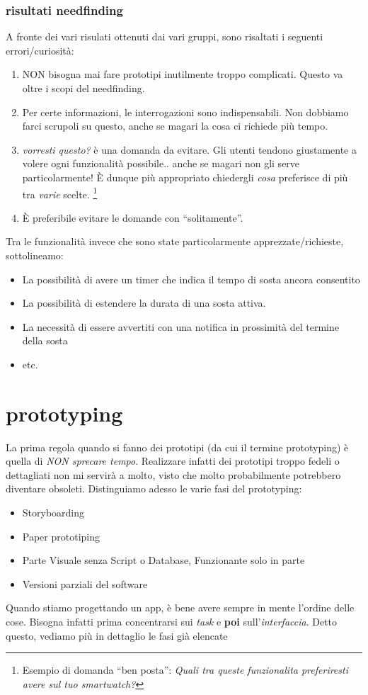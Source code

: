 \documentclass[oneside]{book}
\begin{document}
			\subsubsection{risultati needfinding}
			A fronte dei vari risulati ottenuti dai vari gruppi, sono risaltati i seguenti errori/curiosità:\\
			\begin{enumerate}
			\item NON bisogna mai fare prototipi inutilmente troppo complicati. Questo va oltre i scopi del needfinding. 
			\item Per certe informazioni, le interrogazioni sono indispensabili. Non dobbiamo farci scrupoli su questo, anche se magari la cosa ci richiede più tempo.
			\item \emph{vorresti questo?} è una domanda da evitare. Gli utenti tendono giustamente a volere ogni funzionalità possibile.. anche se magari non gli serve particolarmente! È dunque più appropriato chiedergli \emph{cosa} preferisce di più tra \emph{varie} scelte. \footnote{ Esempio di domanda ``ben posta'': \emph{Quali tra queste funzionalita preferiresti avere sul tuo smartwatch?}}
			\item È preferibile evitare le domande con ``solitamente''.
			\end{enumerate}
			Tra le funzionalità invece che sono state particolarmente apprezzate/richieste, sottolineamo:
			\begin{itemize}
			\item La possibilità di avere un timer che indica il tempo di sosta ancora consentito
			\item La possibilità di estendere la durata di una sosta attiva.
			\item La necessità di essere avvertiti con una notifica in prossimità del termine della sosta
			\item etc.
			\end{itemize}


	\section{prototyping}
		La prima regola quando si fanno dei prototipi (da cui il termine prototyping) è quella di \emph{NON sprecare tempo}. Realizzare infatti dei prototipi troppo fedeli o dettagliati non mi servirà a molto, visto che molto probabilmente potrebbero diventare obsoleti. Distinguiamo adesso le varie fasi del prototyping:
		\begin{itemize}
		\item Storyboarding
		\item Paper prototiping
		\item Parte Visuale senza Script o Database, Funzionante solo in parte
		\item Versioni parziali del software
		\end{itemize}
		Quando stiamo progettando un app, è bene avere sempre in mente l'ordine delle cose. Bisogna infatti prima concentrarsi sui \emph{task} e \textbf{poi} sull'\emph{interfaccia}. Detto questo, vediamo più in dettaglio le fasi già elencate \\
\end{document}
